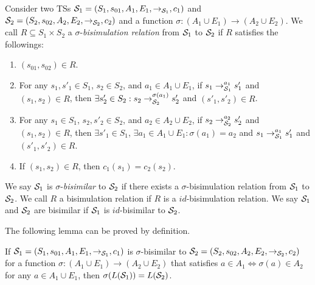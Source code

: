 Consider two TSs
${\cal S}_1=(S_1,s_{01},A_1,E_1,{\to_{{\cal S}_1}},c_1)$ and
${\cal S}_2=(S_2,s_{02},A_2,E_2,{\to_{{\cal S}_2}},\allowbreak c_2)$
and
a function $\sigma:(A_1\cup E_1)\to(A_2\cup E_2)$.
We call $R\subseteq S_1\times S_2$
a $\sigma$-\emph{bisimulation relation} from ${\cal S}_1$ to ${\cal S}_2$
if $R$ satisfies the followings:
\begin{enumerate}[label=(\arabic*)]
\item $(s_{01},s_{02})\in R$.
\item For any $s_1,s'_1\in S_1$, $s_2\in S_2$, and
  $a_1\in A_1\cup E_1$,
  if $s_1\to_{{\cal S}_1}^{a_1} s'_1$ and $(s_1,s_2)\in R$,
  then $\exists s'_2\in S_2: s_2\to_{{\cal S}_2}^{\sigma(a_1)} s'_2$
  and $(s'_1,s'_2)\in R$.
\item For any $s_1\in S_1$, $s_2,s'_2\in S_2$, and
  $a_2\in A_2\cup E_2$,
  if $s_2\to_{{\cal S}_2}^{a_2} s'_2$ and $(s_1,s_2)\in R$,
  then $\exists s'_1\in S_1$, $\exists a_1\in A_1\cup E_1:
  \sigma(a_1)=a_2$ and
  $s_1\to_{{\cal S}_1}^{a_1} s'_1$
  and $(s'_1,s'_2)\in R$.
\item If $(s_1,s_2)\in R$, then $c_1(s_1)=c_2(s_2)$.
\end{enumerate}
%
We say ${\cal S}_1$ is $\sigma$-\emph{bisimilar} to
${\cal S}_2$ if there exists a $\sigma$-bisimulation relation
from ${\cal S}_1$ to ${\cal S}_2$.
%
We call $R$ a bisimulation relation
if $R$ is a $\mathit{id}$-bisimulation relation.
We say ${\cal S}_1$ and ${\cal S}_2$ are bisimilar if
${\cal S}_1$ is $\mathit{id}$-bisimilar to ${\cal S}_2$.

The following lemma can be proved by definition.
\begin{lemma}\label{lemma:bisim-lang}
If
${\cal S}_1=(S_1,s_{01},A_1,E_1,{\to_{{\cal S}_1}},c_1)$ is
$\sigma$-bisimilar to
${\cal S}_2=(S_2,s_{02},A_2,\allowbreak E_2,{\to_{{\cal S}_2}},c_2)$
for
a function $\sigma:(A_1\cup E_1)\to(A_2\cup E_2)$
that satisfies $a\in A_1 \Leftrightarrow \sigma(a)\in A_2$
for any $a\in A_1\cup E_1$,
then
$\sigma(L({\cal S}_1))=L({\cal S}_2)$.
\end{lemma}







